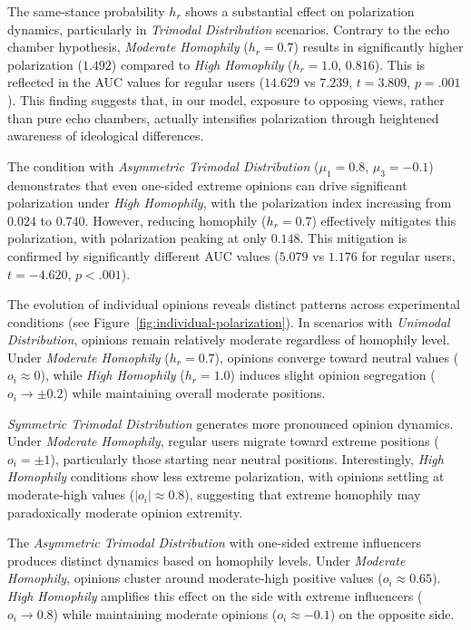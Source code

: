 

The same-stance probability $h_r$ shows a substantial effect on polarization dynamics, particularly in \emph{Trimodal Distribution} scenarios. Contrary to the echo chamber hypothesis, \emph{Moderate Homophily} ($h_r = 0.7$) results in significantly higher polarization ($1.492$) compared to \emph{High Homophily} ($h_r = 1.0$, $0.816$). This is reflected in the AUC values for regular users ($14.629$ vs $7.239$, $t = 3.809$, $p = .001$). This finding suggests that, in our model, exposure to opposing views, rather than pure echo chambers, actually intensifies polarization through heightened awareness of ideological differences.



The condition with \emph{Asymmetric Trimodal Distribution} ($\mu_1 = 0.8$, $\mu_3 = -0.1$) demonstrates that even one-sided extreme opinions can drive significant polarization under \emph{High Homophily}, with the polarization index increasing from $0.024$ to $0.740$. However, reducing homophily ($h_r = 0.7$) effectively mitigates this polarization, with polarization peaking at only $0.148$. This mitigation is confirmed by significantly different AUC values ($5.079$ vs $1.176$ for regular users, $t = -4.620$, $p < .001$).

The evolution of individual opinions reveals distinct patterns across experimental conditions (see Figure~\ref{fig:individual-polarization}). In scenarios with \emph{Unimodal Distribution}, opinions remain relatively moderate regardless of homophily level. Under \emph{Moderate Homophily} ($h_r = 0.7$), opinions converge toward neutral values ($o_i \approx 0$), while \emph{High Homophily} ($h_r = 1.0$) induces slight opinion segregation ($o_i \rightarrow \pm0.2$) while maintaining overall moderate positions.

\emph{Symmetric Trimodal Distribution} generates more pronounced opinion dynamics. Under \emph{Moderate Homophily}, regular users migrate toward extreme positions ($o_i = \pm1$), particularly those starting near neutral positions. Interestingly, \emph{High Homophily} conditions show less extreme polarization, with opinions settling at moderate-high values ($|o_i| \approx 0.8$), suggesting that extreme homophily may paradoxically moderate opinion extremity.

The \emph{Asymmetric Trimodal Distribution} with one-sided extreme influencers produces distinct dynamics based on homophily levels. Under \emph{Moderate Homophily}, opinions cluster around moderate-high positive values ($o_i \approx 0.65$). \emph{High Homophily} amplifies this effect on the side with extreme influencers ($o_i \rightarrow 0.8$) while maintaining moderate opinions ($o_i \approx -0.1$) on the opposite side.


